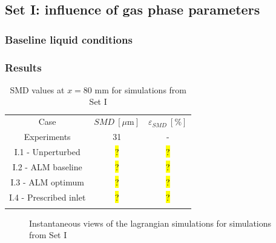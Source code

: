 \clearpage


\subsection{Set I: influence of gas phase parameters}

\subsubsection{Baseline liquid conditions}

\subsubsection{Results}

\begin{table}[!h]
\centering
\caption{SMD values at $x = 80$ mm for simulations from Set I}
\begin{tabular}{ccc}
\thickhline
Case & $SMD~\left[\mu \mathrm{m} \right]$ & $\varepsilon_{SMD}~\left[\% \right]$ \\
\thickhline
Experiments & 31 & - \\
I.1 - Unperturbed & \hl{?} & \hl{?} \\
I.2 - ALM baseline & \hl{?} & \hl{?} \\
I.3 - ALM optimum & \hl{?} & \hl{?} \\
I.4 - Prescribed inlet & \hl{?} & \hl{?} \\
\thickhline
\end{tabular}
\label{tab:results_set_1}
\end{table}

\begin{figure}[ht]
\centering
{}
\caption{Instantaneous views of the lagrangian simulations for simulations from Set I}
\end{figure}




